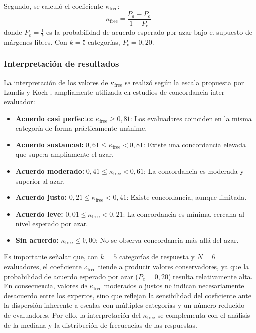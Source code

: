 \begin{enumerate}
          Segundo, se calculó el coeficiente $\kappa_{\text{free}}$:
          \begin{equation}
              \kappa_{\text{free}} = \frac{P_a - P_e}{1 - P_e}
              \label{eq:kappa_free}
          \end{equation}
          donde $P_e = \frac{1}{k}$ es la probabilidad de acuerdo esperado por azar bajo el supuesto de márgenes libres. Con $k = 5$ categorías, $P_e = 0{,}20$.
\end{enumerate}

\subsubsection{Interpretación de resultados}
\label{sec:interpretacion-resultados}

La interpretación de los valores de $\kappa_{\text{free}}$ se realizó según la escala propuesta por Landis y Koch \cite{landis1977}, ampliamente utilizada en estudios de concordancia inter-evaluador:
\begin{itemize}
    \item \textbf{Acuerdo casi perfecto:} $\kappa_{\text{free}} \geq 0{,}81$: Los evaluadores coinciden en la misma categoría de forma prácticamente unánime.
    \item \textbf{Acuerdo sustancial:} $0{,}61 \leq \kappa_{\text{free}} < 0{,}81$: Existe una concordancia elevada que supera ampliamente el azar.
    \item \textbf{Acuerdo moderado:} $0{,}41 \leq \kappa_{\text{free}} < 0{,}61$: La concordancia es moderada y superior al azar.
    \item \textbf{Acuerdo justo:} $0{,}21 \leq \kappa_{\text{free}} < 0{,}41$: Existe concordancia, aunque limitada.
    \item \textbf{Acuerdo leve:} $0{,}01 \leq \kappa_{\text{free}} < 0{,}21$: La concordancia es mínima, cercana al nivel esperado por azar.
    \item \textbf{Sin acuerdo:} $\kappa_{\text{free}} \leq 0{,}00$: No se observa concordancia más allá del azar.
\end{itemize}

Es importante señalar que, con $k = 5$ categorías de respuesta y $N = 6$ evaluadores, el coeficiente $\kappa_{\text{free}}$ tiende a producir valores conservadores, ya que la probabilidad de acuerdo esperado por azar ($P_e = 0{,}20$) resulta relativamente alta. En consecuencia, valores de $\kappa_{\text{free}}$ moderados o justos no indican necesariamente desacuerdo entre los expertos, sino que reflejan la sensibilidad del coeficiente ante la dispersión inherente a escalas con múltiples categorías y un número reducido de evaluadores. Por ello, la interpretación del $\kappa_{\text{free}}$ se complementa con el análisis de la mediana y la distribución de frecuencias de las respuestas.

